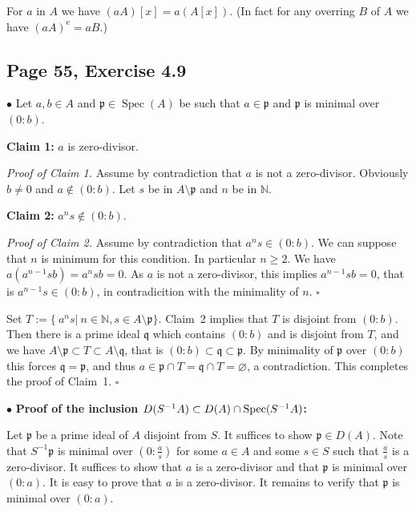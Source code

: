 \documentclass[parskip=half,fontsize=12pt]{scrartcl}%
\newcommand{\oo}{\operatorname}\newcommand{\ooo}{\operatorname*}
\newcommand{\mf}{\mathfrak}
\newcommand{\ppp}{\mf p}
\newcommand{\qqq}{\mf q}
\newcommand{\bu}{\bullet}
\begin{document}
For $a$ in $A$ we have $(aA)[x]=a(A[x])$. (In fact for any overring $B$ of $A$ we have $(aA)^{\oo e}=aB$.) %

\subsection{Page 55, Exercise 4.9}%

$\bu$ Let $a,b\in A$ and $\ppp\in\oo{Spec}(A)$ be such that $a\in\ppp$ and $\ppp$ is minimal over $(0:b)$.

\textbf{Claim 1:} $a$ is zero-divisor.

\emph{Proof of Claim 1.} Assume by contradiction that $a$ is not a zero-divisor. Obviously $b\ne0$ and $a\notin(0:b)$. Let $s$ be in $A\setminus\ppp$ and $n$ be in $\mathbb N$. 

\textbf{Claim 2:} $a^ns\notin(0:b)$.

\emph{Proof of Claim 2.} Assume by contradiction that $a^ns\in(0:b)$. We can suppose that $n$ is minimum for this condition. In particular $n\ge2$. We have $a(a^{n-1}sb)=a^nsb=0$. As $a$ is not a zero-divisor, this implies $a^{n-1}sb=0$, that is $a^{n-1}s\in(0:b)$, in contradicition with the minimality of $n$. $\square$

Set $T:=\{\ a^ns|\ n\in\mathbb N,s\in A\setminus\ppp\}$. Claim~2 implies that $T$ is disjoint from $(0:b)$. Then there is a prime ideal $\qqq$ which contains $(0:b)$ and is disjoint from $T$, and we have $A\setminus\ppp\subset T\subset A\setminus\qqq$, that is $(0:b)\subset\qqq\subset\ppp$. By minimality of $\ppp$ over $(0:b)$ this forces $\qqq=\ppp$, and thus $a\in\ppp\cap T=\qqq\cap T=\varnothing$, a contradiction. This completes the proof of Claim~1. $\square$ 

$\bu$ \textbf{Proof of the inclusion $D(S^{-1}A)\subset D(A)\cap\operatorname{Spec}(S^{-1}A)$: }

Let $\ppp$ be a prime ideal of $A$ disjoint from $S$. It suffices to show $\ppp\in D(A)$. Note that $S^{-1}\ppp$ is minimal over $(0:\frac as)$ for some $a\in A$ and some $s\in S$ such that $\frac as$ is a zero-divisor. It suffices to show that $a$ is a zero-divisor and that $\ppp$ is minimal over $(0:a)$. It is easy to prove that $a$ is a zero-divisor. It remains to verify that $\ppp$ is minimal over $(0:a)$.
\end{document}
